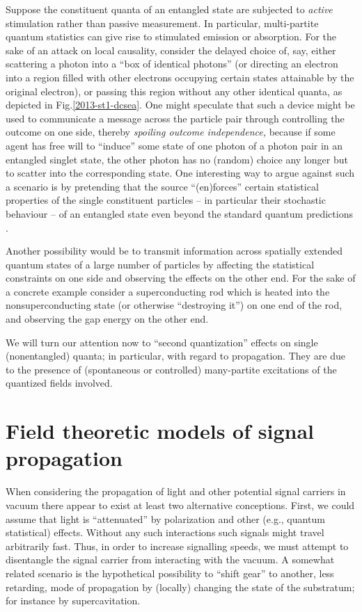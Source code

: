 \documentclass[%
  preprint,
 showpacs,
 showkeys,
 preprintnumbers,
 amsmath,amssymb,
 aps,
  pra,
  longbibliography,
 ]{revtex4-1}
\begin{document}
Suppose the constituent quanta of an entangled state are subjected to
{\em active} stimulation rather than passive measurement.
In particular, multi-partite quantum statistics can give rise to stimulated emission or absorption.
For the sake of an attack \cite{svozil-slash} on local causality, consider the delayed choice of, say, either scattering a photon into a ``box of identical photons''
(or directing an electron into a region filled with other electrons occupying certain states attainable by the original electron), or
passing this region without any other identical quanta, as depicted in Fig.\ref{2013-st1-dcsea}.
One might speculate that such a device might be used to communicate a message across the particle pair through controlling the outcome on one side,
thereby {\em spoiling outcome independence,}
because if some agent has free will to ``induce''
some state of one photon of a photon pair in an entangled singlet state,
the other photon has no (random) choice any longer but to scatter into the corresponding state.
One interesting way to argue against such a scenario is by pretending that the source ``(en)forces'' certain statistical properties of the single constituent particles
-- in particular their stochastic behaviour -- of an entangled state even beyond the standard quantum predictions \cite{zeil-99,svozil-2013-omelette}.

Another possibility would be to transmit information across spatially extended quantum states of a large number of particles by affecting
the statistical constraints on one side and observing the effects on the other end.
For the sake of a concrete example consider a superconducting rod which is heated into the nonsuperconducting state (or otherwise ``destroying it'') on one end of the rod,
and observing the gap energy on the other end.

We will turn our attention now to ``second quantization'' effects on single (nonentangled) quanta; in particular, with regard to propagation.
They are due to the presence of (spontaneous or controlled) many-partite excitations of the quantized fields involved.


\section{Field theoretic models of signal propagation}

When considering the propagation of light and other potential signal carriers in vacuum \cite{einstein-aether,dirac-aether}
there appear to exist at least two alternative conceptions.
First, we could assume that light is ``attenuated'' by polarization
and other (e.g., quantum statistical) effects.
Without any such interactions such signals might travel arbitrarily fast.
Thus, in order to increase signalling speeds,
we must attempt to disentangle the signal carrier from interacting with the vacuum.
A somewhat related scenario is the hypothetical possibility to ``shift gear'' to another,
less retarding, mode of propagation by (locally) changing the state of the substratum; for instance by supercavitation.
\end{document}
